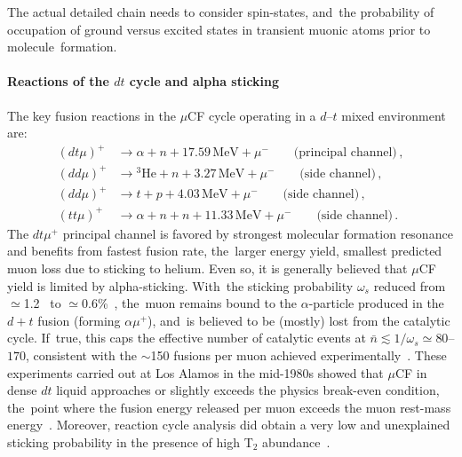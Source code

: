 \documentclass[particles,article,accept,pdftex,moreauthors]{Definitions/mdpi}
\begin{document}
The actual detailed chain needs to consider spin-states, and~the probability of occupation of ground versus excited states in transient muonic atoms prior to molecule~formation.



\vspace{-6pt}\paragraph*{\bf Reactions of the $dt$ cycle and alpha sticking}
The key fusion reactions in the $\mu$CF cycle operating in a $d$--$t$ mixed environment are:
\begin{align}
(dt\mu)^+ &\to \alpha + n + 17.59\,\mathrm{MeV} + \mu^- \qquad \text{(principal channel)}\,,\\
(dd\mu)^+ &\to {}^3\mathrm{He} + n + 3.27\,\mathrm{MeV} + \mu^- \qquad \text{(side channel)}\,,\\
(dd\mu)^+ &\to t + p + 4.03\,\mathrm{MeV} + \mu^- \qquad \text{(side channel)}\,,\\
(tt\mu)^+ &\to \alpha + n + n + 11.33\,\mathrm{MeV} + \mu^- \qquad \text{(side channel)}\,.
\end{align}
The $dt\mu^+$ principal channel is favored by strongest molecular formation resonance and benefits from fastest fusion rate, the~larger energy yield, smallest predicted muon loss due to sticking to helium. Even so, it is generally believed that $\mu$CF yield is limited by alpha-sticking. With~the sticking probability $\omega_s$ reduced from $\simeq$1.2~\cite{Jackson:1957zza} to $\simeq$0.6\%~\cite{jones1993evaluation,Rafelski:1988wq,Jones1997}, the~muon remains bound to the $\alpha$-particle produced in the $d+t$ fusion (forming $\alpha\mu^+$), and~is believed to be (mostly) lost from the catalytic cycle. If~true, this caps the effective number of catalytic events at $\bar{n}\lesssim 1/\omega_s\simeq 80$--$170$, consistent with the $\sim$150 fusions per muon achieved experimentally~\cite{Jones:1983pw,Jones:1986kk}. These experiments carried out at Los Alamos in the mid-1980s showed that $\mu$CF in dense $dt$ liquid approaches or slightly exceeds the physics break-even condition, the~point where the fusion energy released per muon exceeds the muon rest-mass energy~\cite{Rafelski:1990in}. Moreover, reaction cycle analysis did obtain a very low and unexplained sticking probability in the presence of high T$_2$ abundance~\cite{jones1993evaluation}.
\end{document}
